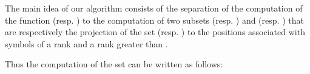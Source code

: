 \documentclass{llncs}
\begin{document}
The main idea of our algorithm consists of the separation of the computation of the function  (resp. ) to the computation of two subsets  (resp. ) and  (resp. ) that are respectively  
the projection of the set  (resp. ) to the positions associated with
symbols of a rank  and a rank greater than .

Thus the computation of the set  can be written as follows:  
 
\end{document}
